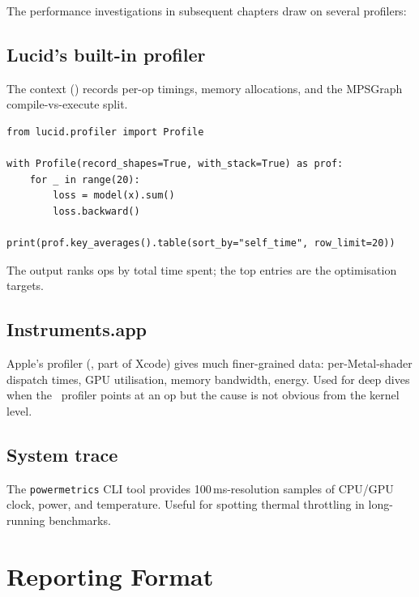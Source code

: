 The performance investigations in subsequent chapters draw on
several profilers:

\subsection{Lucid's built-in profiler}
\label{ssec:perf_methodology:lucid_profiler}

The  context
() records per-op timings, memory
allocations, and the MPSGraph compile-vs-execute split.

\begin{lstlisting}[style=lucid,language=LucidPython]
from lucid.profiler import Profile

with Profile(record_shapes=True, with_stack=True) as prof:
    for _ in range(20):
        loss = model(x).sum()
        loss.backward()

print(prof.key_averages().table(sort_by="self_time", row_limit=20))
\end{lstlisting}

The output ranks ops by total time spent; the top entries are
the optimisation targets.

\subsection{Instruments.app}
\label{ssec:perf_methodology:instruments}

Apple's profiler (, part of Xcode) gives
much finer-grained data: per-Metal-shader dispatch times, GPU
utilisation, memory bandwidth, energy. Used for deep dives when
the \Lucid\ profiler points at an op but the cause is not
obvious from the kernel level.

\subsection{System trace}
\label{ssec:perf_methodology:system_trace}

The \texttt{powermetrics} CLI tool provides 100\,ms-resolution
samples of CPU/GPU clock, power, and temperature. Useful for
spotting thermal throttling in long-running benchmarks.

\section{Reporting Format}
\label{sec:perf_methodology:reporting_format}

